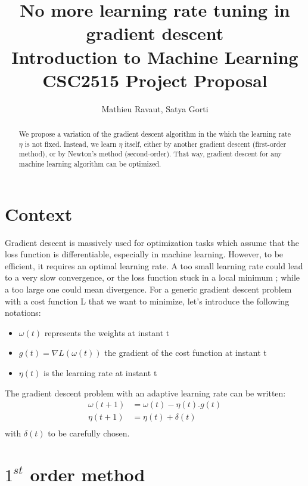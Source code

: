 \documentclass[]{article}
\title{No more learning rate tuning in gradient descent \\
\small{Introduction to Machine Learning CSC2515 Project Proposal}}
\author{Mathieu Ravaut, Satya Gorti}
\begin{document}
\maketitle

\begin{abstract}
	
We propose a variation of the gradient descent algorithm in the which the learning rate $\eta$ is not fixed. Instead, we learn $\eta$ itself, either by another gradient descent (first-order method), or by Newton's method (second-order). That way, gradient descent for any machine learning algorithm can be optimized. 

\end{abstract}

\section{Context}

Gradient descent is massively used for optimization tasks which assume that the loss function is differentiable, especially in machine learning. However, to be efficient, it requires an optimal learning rate. A too small learning rate could lead to a very slow convergence, or the loss function stuck in a local minimum ; while a too large one could mean divergence. For a generic gradient descent problem with a cost function L that we want to minimize, let's introduce the following notations:\\
\begin{itemize}
\item $\omega(t)$ represents the weights at instant t
\item $g(t) = \nabla L(\omega(t))$ the gradient of the cost function at instant t
\item $\eta(t)$ is the learning rate at instant t
\end{itemize}
The gradient descent problem with an adaptive learning rate can be written:\\
\begin{align}
\omega(t+1) &= \omega(t) - \eta(t).g(t)\\
\eta(t+1) &= \eta(t) + \delta(t)\\
\end{align}
with $\delta(t)$ to be carefully chosen. 

\newpage
\section{$1^{st}$ order method}
\end{document}
